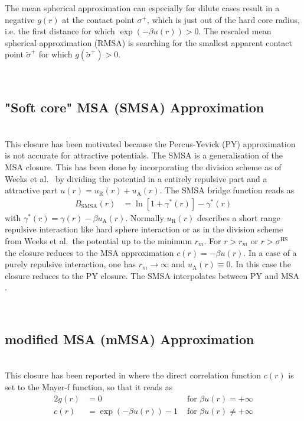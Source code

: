The mean spherical approximation can especially for dilute cases result in a negative $g(r)$ at the contact point $\sigma^+$, which is just out of the hard core radius, i.e. the first distance for which $\exp(-\beta u(r)) >0$. The rescaled mean spherical approximation (RMSA) \cite{Hansen1982} is searching for the smallest apparent contact point $\tilde{\sigma}^+$ for which  $g\left(\tilde{\sigma}^+\right) > 0$.

\vphantom{.}~\\
\subsection{"Soft core" MSA (SMSA) Approximation}
\label{sec:SMSA}~\\

This closure has been motivated because the Percus-Yevick (PY) approximation is not accurate for attractive
potentials. The SMSA \cite{Madden1980,Chihara1973} is a generalisation of the MSA closure. This has been
done by incorporating the division scheme as of Weeks et al.\ \cite{Weeks1971} by dividing the potential
in a entirely repulsive part and a attractive part $u(r) = u_\text{R}(r)+u_\text{A}(r)$. The SMSA bridge function reads as
\begin{align}
B_\text{SMSA}(r) &= \ln \left[1+\gamma^*(r)\right]-\gamma^*(r)
\end{align}
with $\gamma^*(r)=\gamma(r)-\beta u_\text{A}(r)$.
Normally  $u_\text{R}(r)$ describes a short range repulsive interaction like hard sphere interaction or as in the
division scheme from Weeks et al.\ the potential up to the minimum $r_m$. For $r>r_m$ or $r > \sigma^\text{HS}$ the
closure reduces to the MSA approximation $c(r)=-\beta u(r)$. In a case of a purely repulsive interaction, one has
$r_m\rightarrow \infty$ and $u_\text{A}(r) \equiv 0$. In this case the closure reduces to the PY closure.
The SMSA interpolates between PY and MSA \cite{Bomont2008}.

\vphantom{.}~\\
\subsection{modified MSA (mMSA) Approximation}
\label{sec:mMSA}~\\

This closure has been reported in \cite{Gazzillo2003,Gazzillo2004} where the direct correlation function $c(r)$ is set to the Mayer-f function, so that it reads as
\begin{alignat}{2}
g(r) &=  0 &\mbox{ for } \beta u(r) = +\infty \\
c(r) &= \exp\left(-\beta u(r)\right)-1 &\mbox{ for } \beta u(r) \neq +\infty
\end{alignat}

